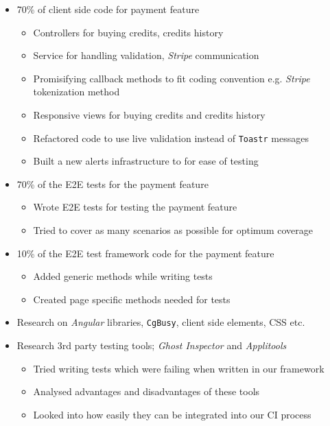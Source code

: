 \begin{itemize}
	\item 70\% of client side code for payment feature
		\begin{itemize}
			\item Controllers for buying credits, credits history
			\item Service for handling validation, \textit{Stripe} communication
      \item Promisifying callback methods to fit coding convention e.g. \textit{Stripe} tokenization method
			\item Responsive views for buying credits and credits history
      \item Refactored code to use live validation instead of \texttt{Toastr} messages
      \item Built a new alerts infrastructure to for ease of testing
		\end{itemize}
	\item 70\% of the E2E tests for the payment feature
		\begin{itemize}
			\item Wrote E2E tests for testing the payment feature
			\item Tried to cover as many scenarios as possible for optimum coverage
		\end{itemize}
	\item 10\% of the E2E test framework code for the payment feature
		\begin{itemize}
			\item Added generic methods while writing tests
      \item Created page specific methods needed for tests
		\end{itemize}
	\item Research on \textit{Angular} libraries, \texttt{CgBusy}, client side elements, CSS etc.
  \item Research 3rd party testing tools; \textit{Ghost Inspector} and \textit{Applitools}
    \begin{itemize}
			\item Tried writing tests which were failing when written in our framework
			\item Analysed advantages and disadvantages of these tools
      \item Looked into how easily they can be integrated into our CI process
		\end{itemize}
\end{itemize}

